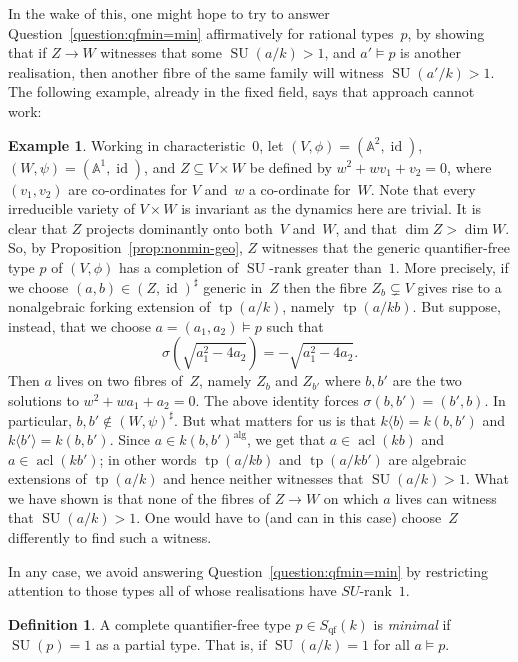\documentclass[\DocOpts]{amsart}
\theoremstyle{definition}
\newtheorem{example}[theorem]{Example}
\newtheorem{definition}[theorem]{Definition}
\def\tp{\operatorname{tp}}
\def\qf{\operatorname{qf}}
\def\acl{\operatorname{acl}}
\def\alg{{\operatorname{alg}}}
\def\su{\operatorname{SU}}
\renewcommand{\AA}{\mathbb{A}}
\providecommand{\id}{\operatorname{id}}
\newcommand{\<}{\langle}
\renewcommand{\>}{\rangle}
\begin{document}
In the wake of this, one might hope to try to answer Question~\ref{question:qfmin=min} affirmatively for rational types~$p$, by showing that if $Z\to W$ witnesses that some $\su(a/k)>1$, and $a'\models p$ is another realisation, then another fibre of the same family will witness $\su(a'/k)>1$.
The following example, already in the fixed field, says that approach cannot work:

\begin{example}
Working in characteristic~$0$, let $(V,\phi)=(\AA^2,\id)$, $(W,\psi)=(\AA^1,\id)$, and $Z\subseteq V\times W$ be defined by $w^2+wv_1+v_2=0$, where $(v_1,v_2)$ are co-ordinates for $V$ and~$w$ a co-ordinate for~$W$.
Note that every irreducible variety of $V\times W$ is invariant as the dynamics here are trivial.
It is clear that $Z$ projects dominantly onto both~$V$ and~$W$, and that $\dim Z>\dim W$.
So, by Proposition~\ref{prop:nonmin-geo}, $Z$ witnesses that the generic quantifier-free type $p$ of $(V,\phi)$ has a completion of $\su$-rank greater than~$1$.
More precisely, if we choose $(a,b)\in (Z,\id)^\sharp$ generic in~$Z$ then the fibre $Z_b\subsetneq V$ gives rise to a nonalgebraic forking extension of $\tp(a/k)$, namely $\tp(a/kb)$.
But suppose, instead, that we choose $a=(a_1,a_2)\models p$ such that
\begin{equation*}
\sigma\left(\sqrt{a_1^2-4a_2}\right)=-\sqrt{a_1^2-4a_2}.
\end{equation*}
Then $a$ lives on two fibres of~$Z$, namely $Z_b$ and $Z_{b'}$ where $b, b'$ are the two solutions to $w^2+wa_1+a_2=0$.
The above identity forces $\sigma(b,b')=(b',b)$.
In particular, $b,b'\notin(W,\psi)^\sharp$.
But what matters for us is that $k\langle b\rangle=k(b,b')$ and $k\langle b'\rangle=k(b,b')$.
Since $a\in k(b,b')^{\alg}$, we get that $a\in\acl(kb)$ and $a\in\acl(kb')$; in other words $\tp(a/kb)$ and $\tp(a/kb')$ are algebraic extensions of $\tp(a/k)$ and hence neither witnesses that $\su(a/k)>1$.
What we have shown is that none of the fibres of $Z\to W$ on which $a$ lives can witness that $\su(a/k)>1$.
One would have to (and can in this case) choose~$Z$ differently to find such a witness.
\end{example}

In any case, we avoid answering Question~\ref{question:qfmin=min} by restricting attention to those types all of whose realisations have $SU$-rank~$1$.

\begin{definition}
A complete quantifier-free type $p\in S_{\qf}(k)$ is \emph{minimal} if $\su(p)=1$ as a partial type. That is, if $\su(a/k)=1$ for all $a\models p$.
\end{definition}
\end{document}
